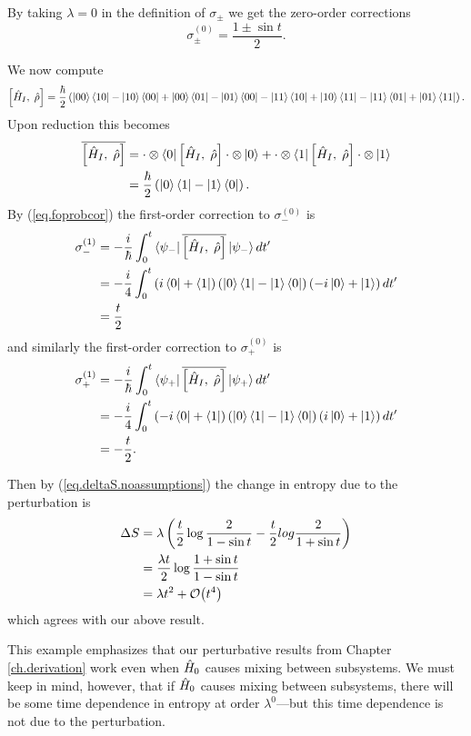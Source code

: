 By taking \(\lambda=0\) in the definition of \(\sigma_\pm\) we get the zero-order corrections
\[
\sigma_\pm^{(0)} = \frac{1\pm \sin t}{2}.
\]

We now compute
\[
\left[\hat{H}_I, \;\hat{\rho}\right] = \frac{\hbar}{2} \left(\left|00\right\rangle\left\langle10\right|- \left|10\right\rangle\left\langle00\right| + \left|00\right\rangle\left\langle01\right| - \left|01\right\rangle\left\langle00\right| - \left|11\right\rangle\left\langle10\right| + \left|10\right\rangle\left\langle11\right| - \left|11\right\rangle\left\langle01\right| +\left|01\right\rangle\left\langle11\right|\right).
\]
Upon reduction this becomes
\begin{align*}
\overline{\left[\hat{H}_I, \;\hat{\rho}\right]} &= \cdot\otimes\left\langle0\right| \left[\hat{H}_I, \;\hat{\rho}\right] \cdot\otimes\left|0\right\rangle + \cdot\otimes\left\langle1\right| \left[\hat{H}_I, \;\hat{\rho}\right] \cdot\otimes\left|1\right\rangle \\
&= \frac{\hbar}{2}\left(\left|0\right\rangle\left\langle1\right| - \left|1\right\rangle\left\langle0\right|\right).
\end{align*}
By (\ref{eq.foprobcor}) the first-order correction to \(\sigma_-^{(0)}\) is
\begin{align*}
\sigma_-^{(1)} &= -\frac{i}{\hbar} \int_{0}^t \left\langle\psi_-\right| \overline{\left[\hat{H}_I, \;\hat{\rho}\right]} \left|\psi_-\right\rangle dt^\prime \\
&= -\frac{i}{4} \int_{0}^t \left(i\left\langle0\right| + \left\langle1\right|\right) \left(\left|0\right\rangle\left\langle1\right| - \left|1\right\rangle\left\langle0\right|\right) \left(-i\left|0\right\rangle + \left|1\right\rangle\right) dt^\prime \\
&= \frac{t}{2}
\end{align*}
and similarly the first-order correction to \(\sigma_+^{(0)}\) is
\begin{align*}
\sigma_+^{(1)} &= -\frac{i}{\hbar} \int_{0}^t \left\langle\psi_+\right| \overline{\left[\hat{H}_I, \;\hat{\rho}\right]} \left|\psi_+\right\rangle dt^\prime \\
&= -\frac{i}{4} \int_{0}^t \left(-i\left\langle0\right| + \left\langle1\right|\right) \left(\left|0\right\rangle\left\langle1\right| - \left|1\right\rangle\left\langle0\right|\right) \left(i\left|0\right\rangle + \left|1\right\rangle\right) dt^\prime \\
&= -\frac{t}{2}.
\end{align*}

Then by (\ref{eq.deltaS.noassumptions}) the change in entropy due to the perturbation is
\begin{align*}
\Delta S &= \lambda \left(\frac{t}{2} \log \frac{2}{1 - \sin t} - \frac{t}{2}log\frac{2}{1+\sin t}\right) \\
&= \frac{\lambda t}{2} \log \frac{1+ \sin t}{1 - \sin t} \\
&= \lambda t^2 + \mathcal{O}{\left(t^4\right)}
\end{align*}
which agrees with our above result.

This example emphasizes that our perturbative results from Chapter \ref{ch.derivation} work even when \(\hat{H}_0\) causes mixing between subsystems. We must keep in mind, however, that if \(\hat{H}_0\) causes mixing between subsystems, there will be some time dependence in entropy at order \(\lambda^0\)---but this time dependence is not due to the perturbation.

